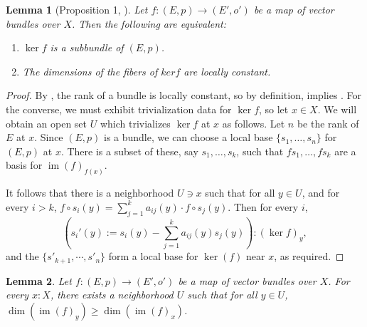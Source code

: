 \documentclass[11pt]{article}
\newcommand{\im}{\operatorname{im}}
\renewcommand{\ker}{\operatorname{ker}}
\theoremstyle{plain}
\newtheorem{lemma}{Lemma}[section]
\theoremstyle{definition}
\begin{document}
\begin{lemma}[Proposition 1, \cite{swan1962vector}]\label{lemma:proposition-1}
  Let \(f : (E,p) \to (E',o')\) be a map of vector bundles over \(X\). Then the following are equivalent:
  \begin{enumerate}[label={(\alph*)}]
  \item \label{lemma:proposition-1-1} \(\ker f\) is a subbundle of \((E,p)\).
  \item \label{lemma:proposition-1-2} The dimensions of the fibers of \(ker f\) are locally constant.
  \end{enumerate}
\end{lemma}
\begin{proof}
  By , the rank of a bundle is locally constant, so by definition,  implies . For the converse, we must exhibit trivialization data for \(\ker f\), so let \(x \in X\). We will obtain an open set \(U\) which trivializes \(\ker f\) at \(x\) as follows. Let \(n\) be the rank of \(E\) at \(x\). Since \((E,p)\) is a bundle, we can choose a local base \(\{s_1, \dots, s_n\}\) for \((E,p)\) at \(x\). There is a subset of these, say \(s_1, \dots, s_k\), such that \(f s_1, \dots, f s_k\) are a basis for \(\im(f)_{f(x)}\).


  It follows that there is a neighborhood \(U \ni x\) such that for all \(y \in U\), and for every \(i > k\), \(f \circ s_i(y) = \sum_{j = 1}^k a_{ij}(y) \cdot f \circ s_j(y).\) Then for every \(i\),
  \[\left( s_i'(y) := s_i(y) - \sum_{j = 1}^k a_{ij}(y)s_j(y) \right) : (\ker f)_y,\]
  and the $\{s'_{k+1}, \cdots, s'_{n}\}$ form a local base for \(\ker(f)\) near \(x\), as required.
\end{proof}

\begin{lemma}\label{lemma:proposition-1-aux}
  Let \(f : (E,p) \to (E', o')\) be a map of vector bundles over \(X\). For every \(x : X\), there exists a neighborhood \(U\) such that for all \(y \in U\), \(\dim(\im(f)_y) \geq \dim(\im(f)_x)\).
\end{lemma}
\end{document}
